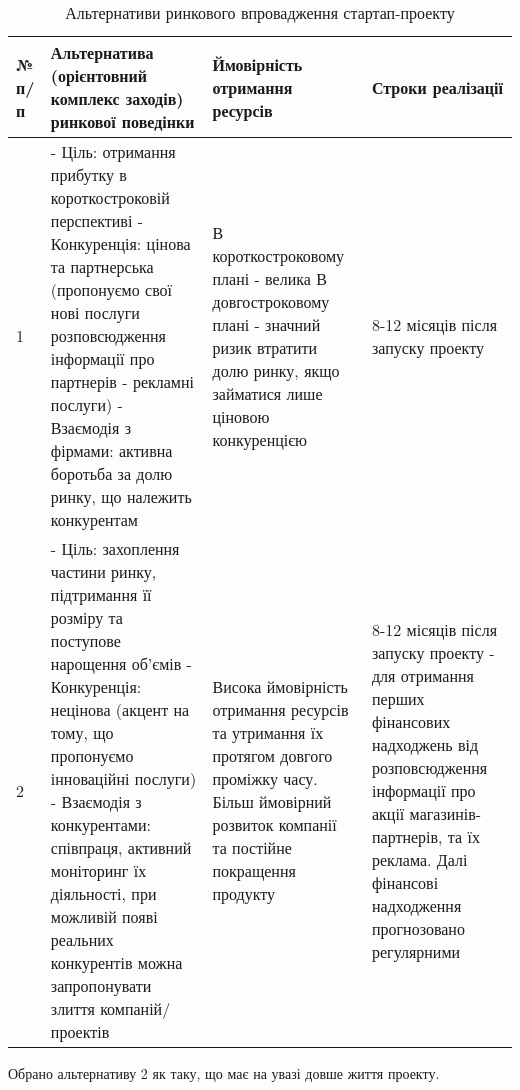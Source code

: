 \begin{table}[h!]
\fontsize{12pt}{12pt}\selectfont
	\begin{tabularx}{\textwidth}{|l|X|X|X|}
    \hline
    № п/п & Альтернатива (орієнтовний комплекс заходів) ринкової поведінки & Ймовірність отримання ресурсів & Строки реалізації \\ \hline
    1 & - Ціль: отримання прибутку в короткостроковій перспективі
    - Конкуренція: цінова та партнерська (пропонуємо свої нові послуги розповсюдження інформації про партнерів - рекламні послуги)
    - Взаємодія з фірмами: активна боротьба за долю ринку, що належить конкурентам & В короткостроковому плані - велика
    В довгостроковому плані - значний ризик втратити долю ринку, якщо займатися лише ціновою конкуренцією & 8-12 місяців після запуску проекту \\ \hline
    2 & - Ціль: захоплення частини ринку, підтримання її розміру та поступове нарощення об'ємів
    - Конкуренція: нецінова (акцент на тому, що пропонуємо інноваційні послуги)
    - Взаємодія з конкурентами: співпраця, активний моніторинг їх діяльності, при можливій появі реальних конкурентів можна запропонувати злиття компаній/проектів & Висока ймовірність отримання ресурсів та утримання їх протягом довгого проміжку часу. Більш ймовірний розвиток компанії та постійне покращення продукту & 8-12 місяців після запуску проекту - для отримання перших фінансових надходжень від розповсюдження інформації про акції магазинів-партнерів, та їх реклама. Далі фінансові надходження прогнозовано регулярними \\
    \hline
    \end{tabularx}
\caption{Альтернативи ринкового впровадження стартап-проекту} \label{tab:stab_9}
\end{table}
Обрано альтернативу 2 як таку, що має на увазі довше життя проекту.

